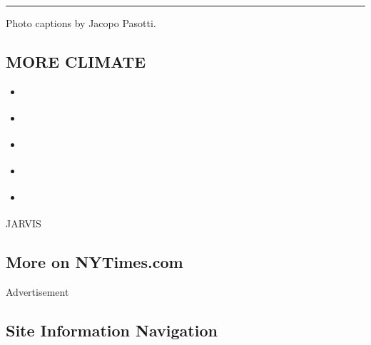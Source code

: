 \begin{center}\rule{0.5\linewidth}{\linethickness}\end{center}

Photo captions by Jacopo Pasotti.

\hypertarget{more-climate}{%
\subsection{MORE CLIMATE}\label{more-climate}}

\begin{itemize}
\tightlist
\item
  \href{https://www.nytimes3xbfgragh.onion/interactive/2019/04/10/magazine/climate-change-pinkertons.html}{}
\item
  \href{https://www.nytimes3xbfgragh.onion/interactive/2019/04/11/magazine/climate-change-exxon-renewable-energy.html}{}
\item
  \href{https://www.nytimes3xbfgragh.onion/interactive/2019/04/09/magazine/climate-change-capitalism.html}{}
\item
  \href{https://www.nytimes3xbfgragh.onion/interactive/2019/04/09/magazine/climate-change-politics-economics.html}{}
\item
  \href{https://www.nytimes3xbfgragh.onion/interactive/2019/04/09/magazine/climate-change-peru-law.html}{}
\end{itemize}

JARVIS

\hypertarget{more-on-nytimescom}{%
\subsection{More on NYTimes.com}\label{more-on-nytimescom}}

Advertisement

\hypertarget{site-information-navigation}{%
\subsection{Site Information
Navigation}\label{site-information-navigation}}

